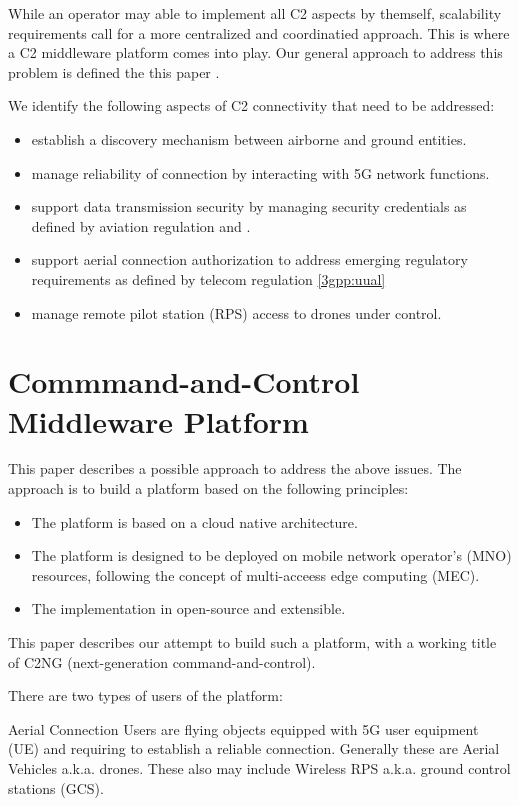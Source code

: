 \documentclass[a4paper,conference]{IEEEtran}
\begin{document}
While an operator may able to implement all C2 aspects by themself, scalability requirements call for a more centralized and coordinatied approach. This is where a C2 middleware platform comes into play. Our general approach to address this problem is defined the this paper \cite{uai}.

We identify the following aspects of C2 connectivity that need to be addressed:

\begin{itemize}
\item establish a discovery mechanism between airborne and ground entities.
\item manage reliability of connection by interacting with 5G network functions.
\item support data transmission security by managing security credentials as defined by aviation regulation \cite{icao:annex10VI} and \cite{rtca:do377a}.
\item support aerial connection authorization to address emerging regulatory requirements as defined by telecom regulation \ref{3gpp:uual}
\item manage remote pilot station (RPS) access to drones under control.
\end{itemize}


\section{Commmand-and-Control Middleware Platform}

This paper describes a possible approach to address the above issues. The approach is to build a platform based on the following principles:

\begin{itemize}
\item The platform is based on a cloud native architecture.
\item The platform is designed to be deployed on mobile network operator's (MNO) resources, following the concept of multi-acceess edge computing (MEC).
\item The implementation in open-source and extensible.
\end{itemize}

This paper describes our attempt to build such a platform, with a working title of C2NG (next-generation command-and-control).

There are two types of users of the platform:

Aerial Connection Users are flying objects equipped with 5G user equipment (UE) and requiring to establish a reliable connection. Generally these are Aerial Vehicles a.k.a. drones. These also may include Wireless RPS a.k.a. ground control stations (GCS).
\end{document}
